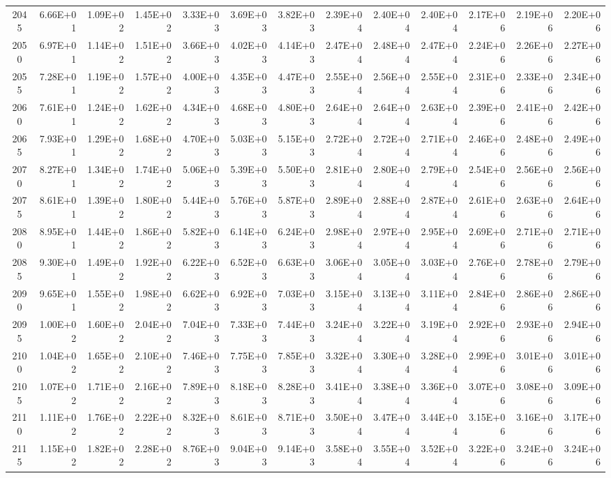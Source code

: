 \documentclass{article}
\begin{document}
\begin{table}
\begin{tabular}{crrr|rrr|rrr|rrr}
2045     & 6.66E+01 & 1.09E+02 & 1.45E+02 & 3.33E+03 & 3.69E+03 & 3.82E+03 & 2.39E+04 & 2.40E+04 & 2.40E+04 & 2.17E+06 & 2.19E+06 & 2.20E+06 \\
2050     & 6.97E+01 & 1.14E+02 & 1.51E+02 & 3.66E+03 & 4.02E+03 & 4.14E+03 & 2.47E+04 & 2.48E+04 & 2.47E+04 & 2.24E+06 & 2.26E+06 & 2.27E+06 \\
2055     & 7.28E+01 & 1.19E+02 & 1.57E+02 & 4.00E+03 & 4.35E+03 & 4.47E+03 & 2.55E+04 & 2.56E+04 & 2.55E+04 & 2.31E+06 & 2.33E+06 & 2.34E+06 \\
2060     & 7.61E+01 & 1.24E+02 & 1.62E+02 & 4.34E+03 & 4.68E+03 & 4.80E+03 & 2.64E+04 & 2.64E+04 & 2.63E+04 & 2.39E+06 & 2.41E+06 & 2.42E+06 \\
2065     & 7.93E+01 & 1.29E+02 & 1.68E+02 & 4.70E+03 & 5.03E+03 & 5.15E+03 & 2.72E+04 & 2.72E+04 & 2.71E+04 & 2.46E+06 & 2.48E+06 & 2.49E+06 \\
2070     & 8.27E+01 & 1.34E+02 & 1.74E+02 & 5.06E+03 & 5.39E+03 & 5.50E+03 & 2.81E+04 & 2.80E+04 & 2.79E+04 & 2.54E+06 & 2.56E+06 & 2.56E+06 \\
2075     & 8.61E+01 & 1.39E+02 & 1.80E+02 & 5.44E+03 & 5.76E+03 & 5.87E+03 & 2.89E+04 & 2.88E+04 & 2.87E+04 & 2.61E+06 & 2.63E+06 & 2.64E+06 \\
2080     & 8.95E+01 & 1.44E+02 & 1.86E+02 & 5.82E+03 & 6.14E+03 & 6.24E+03 & 2.98E+04 & 2.97E+04 & 2.95E+04 & 2.69E+06 & 2.71E+06 & 2.71E+06 \\
2085     & 9.30E+01 & 1.49E+02 & 1.92E+02 & 6.22E+03 & 6.52E+03 & 6.63E+03 & 3.06E+04 & 3.05E+04 & 3.03E+04 & 2.76E+06 & 2.78E+06 & 2.79E+06 \\
2090     & 9.65E+01 & 1.55E+02 & 1.98E+02 & 6.62E+03 & 6.92E+03 & 7.03E+03 & 3.15E+04 & 3.13E+04 & 3.11E+04 & 2.84E+06 & 2.86E+06 & 2.86E+06 \\
2095     & 1.00E+02 & 1.60E+02 & 2.04E+02 & 7.04E+03 & 7.33E+03 & 7.44E+03 & 3.24E+04 & 3.22E+04 & 3.19E+04 & 2.92E+06 & 2.93E+06 & 2.94E+06 \\
2100     & 1.04E+02 & 1.65E+02 & 2.10E+02 & 7.46E+03 & 7.75E+03 & 7.85E+03 & 3.32E+04 & 3.30E+04 & 3.28E+04 & 2.99E+06 & 3.01E+06 & 3.01E+06 \\
2105     & 1.07E+02 & 1.71E+02 & 2.16E+02 & 7.89E+03 & 8.18E+03 & 8.28E+03 & 3.41E+04 & 3.38E+04 & 3.36E+04 & 3.07E+06 & 3.08E+06 & 3.09E+06 \\
2110     & 1.11E+02 & 1.76E+02 & 2.22E+02 & 8.32E+03 & 8.61E+03 & 8.71E+03 & 3.50E+04 & 3.47E+04 & 3.44E+04 & 3.15E+06 & 3.16E+06 & 3.17E+06 \\
2115     & 1.15E+02 & 1.82E+02 & 2.28E+02 & 8.76E+03 & 9.04E+03 & 9.14E+03 & 3.58E+04 & 3.55E+04 & 3.52E+04 & 3.22E+06 & 3.24E+06 & 3.24E+06 \\

\end{tabular}
\end{table}
\end{document}
